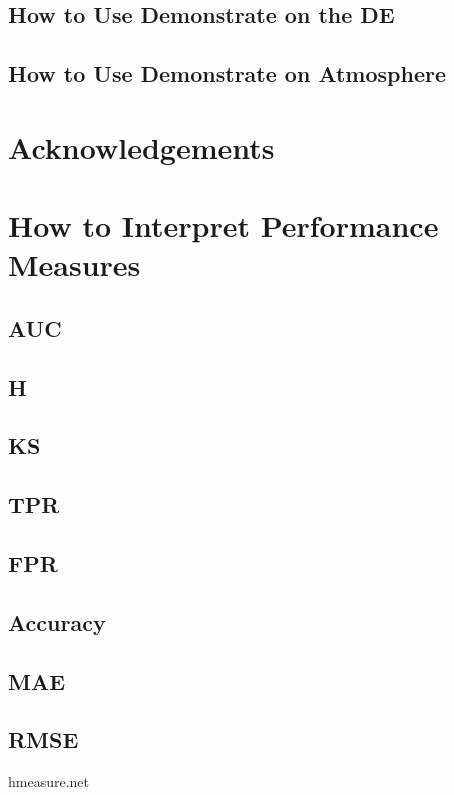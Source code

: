 \documentclass[twoside,a4paper]{refart}
\begin{document}
\subsection{How to Use Demonstrate on the DE}

\subsection{How to Use Demonstrate on Atmosphere}

\section{Acknowledgements}

\section{How to Interpret Performance Measures}

\subsection{AUC}

\subsection{H}

\subsection{KS}

\subsection{TPR}

\subsection{FPR}

\subsection{Accuracy}

\subsection{MAE}

\subsection{RMSE}

hmeasure.net
\end{document}
